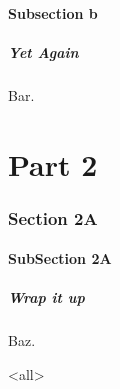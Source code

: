 \documentclass[ignorenonframetext,12pt,aspectratio=169]{beamer}
\begin{document}
\subsection{Subsection b}
\label{subsectionb}

\begin{frame}[fragile]
\frametitle{Yet Again}
\label{yetagain}

Bar.

\end{frame}

\part{Part 2}
\label{part2}

\section{Section 2A}
\label{section2a}

\subsection{SubSection 2A}
\label{subsection2a}

\begin{frame}[fragile]
\frametitle{Wrap it up}
\label{wrapitup}

Baz.
\end{frame}

\mode<all>
\ifdefined\makethankyou
\makethankyou
\fi
\end{document}
